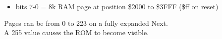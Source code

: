 \begin{itemize}
\item bits 7-0 = 8k RAM page at position \$2000 to \$3FFF (\$ff on
  reset)
\end{itemize}
Pages can be from 0 to 223 on a fully expanded Next.\\
A 255 value causes the ROM to become visible.

